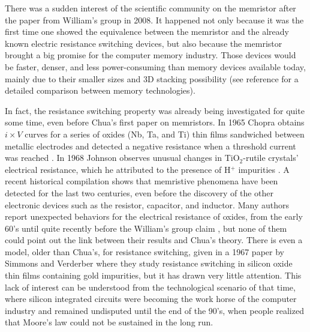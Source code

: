 There was a sudden interest of the scientific community on the memristor after the paper from William's group in 2008. It happened not only because it was the first time one showed the equivalence between the memristor and the already known electric resistance switching devices, but also because the memristor brought a big promise for the computer memory industry. Those devices would be faster, denser, and less power-consuming than memory devices available today, mainly due to their smaller sizes and 3D stacking possibility (see reference \cite{Jeong2012} for a detailed comparison between memory technologies). 

In fact, the resistance switching property was already being investigated for quite some time, even before Chua's first paper on memristors. In 1965 Chopra obtains $i \times V$ curves for a series of oxides (Nb, Ta, and Ti) thin films sandwiched between metallic electrodes and detected a negative resistance when a threshold current was reached \cite{Chopra1965}. In 1968 Johnson observes unusual changes in TiO$_2$-rutile crystals' electrical resistance, which he attributed to the presence of H$^+$ impurities \cite{Johnson1968}. A recent historical compilation \cite{Prodromakis2012} shows that memristive phenomena have been detected for the last two centuries, even before the discovery of the other electronic devices such as the resistor, capacitor, and inductor. Many authors report unexpected behaviors for the electrical resistance of oxides, from the early 60's until quite recently before the William's group claim \cite{Hickmott1962,Argall1968,Oxley1977,Hirose1976,Upadhyaya1995,Beck2000,Waser2007}, but none of them could point out the link between their results and Chua's theory. There is even a model, older than Chua's, for resistance switching, given in a 1967 paper by Simmons and Verderber \cite{Simmons1967} where they study resistance switching in silicon oxide thin films containing gold impurities, but it has drawn very little attention. This lack of interest can be understood from the technological scenario of that time, where silicon integrated circuits were becoming the work horse of the computer industry and remained undisputed until the end of the 90's, when people realized that Moore's law \cite{Moore1998} could not be sustained in the long run.

